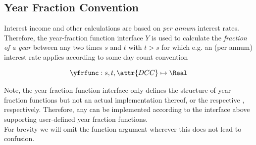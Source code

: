 \subsection{Year Fraction Convention}\label{sec:yearfrac}

Interest income and other calculations are based on \textit{per annum} interest rates. Therefore, the year-fraction function interface $Y$ is used to calculate the \textit{fraction of a year} between any two times $s$ and $t$ with $t>s$ for which e.g. an (per annum) interest rate applies according to some day count convention 

\[
	\yfrfunc: s,t,\attr{DCC} \mapsto \Real
\]

Note, the year fraction function interface only defines the structure of year fraction functions but not an actual implementation thereof, or the respective , respectively. Therefore, any  can be implemented according to the interface above supporting user-defined year fraction functions.\\

For brevity we will omit the  function argument wherever this does not lead to confusion.


